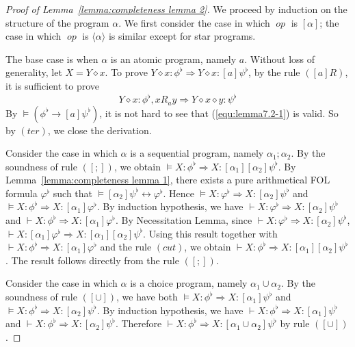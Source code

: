 \documentclass[manuscript,screen]{acmart}
\newcommand{\la}[0]{\langle}
\newcommand{\ra}[0]{\rangle}
\DeclareMathOperator{\seq}{;}
\newcommand{\cat}[0]{\diamond}
\DeclareMathOperator{\op}{\mathit{op}}
\begin{document}
\begin{proof}[Proof of Lemma~\ref{lemma:completeness lemma 2}]
    We proceed by induction on the structure of the program $\alpha$. 
We first consider the case in which $\op$ is $[\alpha]$; the case in which $\op$ is $\la\alpha\ra$ is similar except for star programs. 

    The base case is when $\alpha$ is an atomic program, namely $a$. 
    Without loss of generality, let $X = Y\cat x$. 
    To prove $Y\cat x: \phi^\flat\Rightarrow Y\cat x : [a]\psi^\flat$, 
by the rule $([a]R)$, it is sufficient to prove 
    \begin{equation}
    \label{equ:lemma7.2-1}
        Y\cat x: \phi^\flat, x R_a y\Rightarrow Y\cat x\cat y : \psi^\flat
    \end{equation}
    By $\models (\phi^\flat\to [a]\psi^\flat)$, it is not hard to see that (\ref{equ:lemma7.2-1}) is valid. 
    So by $(\textit{ter})$, we close the derivation. 

Consider the case in which $\alpha$ is a sequential program, namely $\alpha_1\seq\alpha_2$. 
    By the soundness of rule $([\seq])$, we obtain $\models X : \phi^\flat\Rightarrow X : [\alpha_1][\alpha_2]\psi^\flat$. 
    By Lemma~\ref{lemma:completeness lemma 1}, there exists a pure arithmetical FOL formula $\varphi^\flat$ such that $\models [\alpha_2]\psi^\flat\leftrightarrow \varphi^\flat$. 
    Hence $\models X : \varphi^\flat\Rightarrow X : [\alpha_2]\psi^\flat$ and $\models X : \phi^\flat\Rightarrow X : [\alpha_1]\varphi^\flat$. 
    By induction hypothesis, we have
    $\vdash X : \varphi^\flat\Rightarrow X : [\alpha_2]\psi^\flat$
    and 
    $\vdash X : \phi^\flat\Rightarrow X : [\alpha_1]\varphi^\flat$. 
    By Necessitation Lemma, since $\vdash X : \varphi^\flat\Rightarrow X : [\alpha_2]\psi^\flat$, 
    $\vdash X : [\alpha_1]\varphi^\flat\Rightarrow X : [\alpha_1][\alpha_2]\psi^\flat$. 
Using this result together with $\vdash X : \phi^\flat\Rightarrow X : [\alpha_1]\varphi^\flat$ and the rule $(\textit{cut})$, we obtain 
    $\vdash X : \phi^\flat\Rightarrow X : [\alpha_1][\alpha_2]\psi^\flat$. 
The result follows directly from the rule $([\seq])$. 

Consider the case in which $\alpha$ is a choice program, namely $\alpha_1\cup \alpha_2$. 
    By the soundness of rule $([\cup])$, %
    we have both $\models X : \phi^\flat\Rightarrow X :  [\alpha_1]\psi^\flat$ and $\models X : \phi^\flat\Rightarrow X : [\alpha_2]\psi^\flat$. 
    By induction hypothesis, we have 
    $\vdash X : \phi^\flat\Rightarrow X :  [\alpha_1]\psi^\flat$ and 
    $\vdash X : \phi^\flat\Rightarrow X : [\alpha_2]\psi^\flat$. 
    Therefore $\vdash X : \phi^\flat\Rightarrow X : [\alpha_1\cup \alpha_2]\psi^\flat$ by rule $([\cup])$. 


\end{proof}
\end{document}
